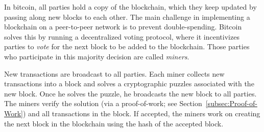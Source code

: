 \documentclass[11pt]{article}
\theoremstyle{plain}
\begin{document}
In bitcoin, all parties hold a copy of the blockchain, which they
keep updated by passing along new blocks to each other. The main challenge
in implementing a blockchain on a peer-to-peer network is to prevent
double-spending. Bitcoin solves this by running a decentralized voting
protocol, where it incentivizes parties to \emph{vote} for the next
block to be added to the blockchain. Those parties who participate
in this majority decision are called \emph{miners}. 

New transactions are broadcast to all parties. Each miner collects
new transactions into a block and solves a cryptographic puzzles associated
with the new block. Once he solves the puzzle, he broadcasts the new
block to all parties. The miners verify the solution (via a proof-of-work;
see Section~\ref{subsec:Proof-of-Work}) and all transactions in
the block. If accepted, the miners work on creating the next block
in the blockchain using the hash of the accepted block. 
\end{document}
